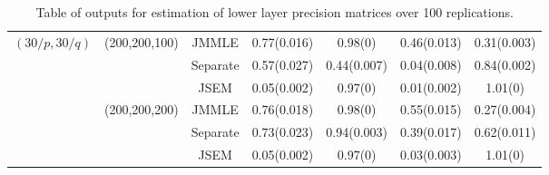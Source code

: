 \begin{scriptsize}
\begin{table}
\begin{tabular}{ccccccc}
    $(30/p, 30/q)$ & (200,200,100) & JMMLE    & 0.77(0.016) & 0.98(0)      & 0.46(0.013)  & 0.31(0.003) \\
    ~              & ~             & Separate & 0.57(0.027) & 0.44(0.007)  & 0.04(0.008)  & 0.84(0.002)\\
    ~              & ~             & JSEM     & 0.05(0.002) & 0.97(0)      & 0.01(0.002)  & 1.01(0)     \\\hline
    ~              & (200,200,200) & JMMLE    & 0.76(0.018)  & 0.98(0)     & 0.55(0.015)  & 0.27(0.004) \\
    ~              & ~             & Separate & 0.73(0.023) & 0.94(0.003)  & 0.39(0.017)  & 0.62(0.011)\\
    ~              & ~             & JSEM     & 0.05(0.002) & 0.97(0)      & 0.03(0.003)  & 1.01(0)     \\\hline
    \end{tabular}
    \caption{Table of outputs for estimation of lower layer precision matrices over 100 replications.}
    \label{table:simtable12}
\end{table}
\end{scriptsize}


